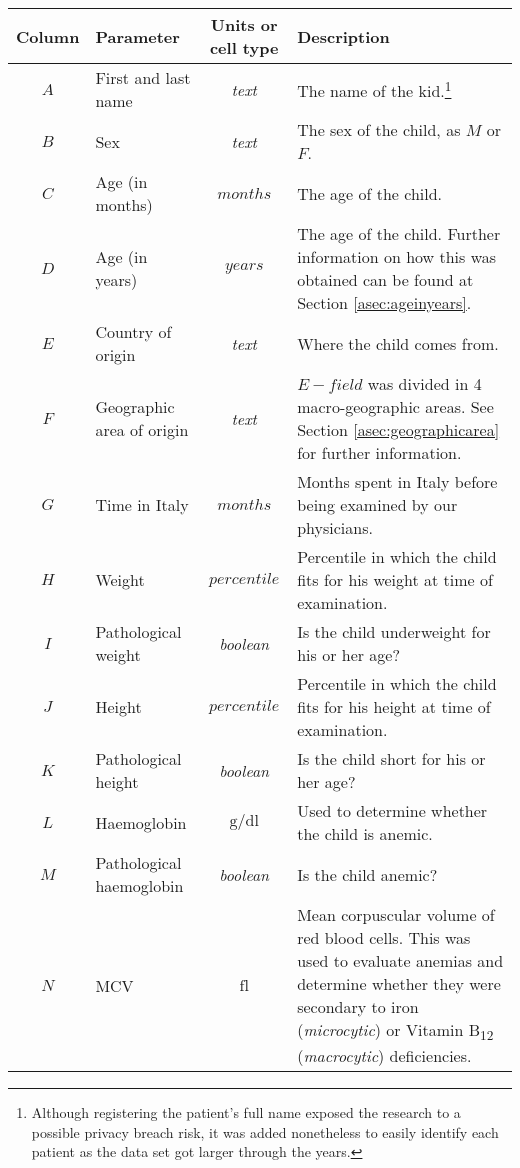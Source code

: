 \begin{footnotesize}
	\centering
	\begin{longtable}{C{.09\mylength} p{.25\mylength} C{.20\mylength} p{.40\mylength}}
		Column & Parameter & Units or cell type & Description\\
		\hline
		$A$ & First and last name & \textit{text} & The name of the kid.\footnote{Although registering the patient's full name exposed the research to a possible privacy breach risk, it was added nonetheless to easily identify each patient as the data set got larger through the years.}\\
		$B$ & Sex & \textit{text} & The sex of the child, as $M$ or $F$.\\
		$C$ & Age (in months) & $months$ & The age of the child.\\
		$D$ & Age (in years) & $years$ & The age of the child. Further information on how this was obtained can be found at Section \ref{asec:ageinyears}.\\
		$E$ & Country of origin & \textit{text} & Where the child comes from.\\
		$F$ & Geographic area of origin & \textit{text} & $E-field$ was divided in 4 macro-geographic areas. See Section \ref{asec:geographicarea} for further information.\\
		$G$ & Time in Italy & $months$ &  Months spent in Italy before being examined by our physicians.\\
		$H$ & Weight & $percentile$ & Percentile in which the child fits for his weight at time of examination.\\
		$I$ & Pathological weight & \textit{boolean} & Is the child underweight for his or her age?\\
		$J$ & Height & $percentile$ & Percentile in which the child fits for his height at time of examination.\\
		$K$ & Pathological height & \textit{boolean} & Is the child short for his or her age?\\
		$L$ & Haemoglobin & $\si{\gram}/\si{\deci\litre}$ & Used to determine whether the child is anemic.\\
		$M$ & Pathological haemoglobin & \textit{boolean} & Is the child anemic?\\
		$N$ & MCV & $\si{\femto\litre}$ & Mean corpuscular volume of red blood cells. This was used to evaluate anemias and determine whether they were secondary to iron (\textit{microcytic}) or Vitamin B\textsubscript{12} (\textit{macrocytic}) deficiencies.\\

\end{longtable}
\end{footnotesize}
